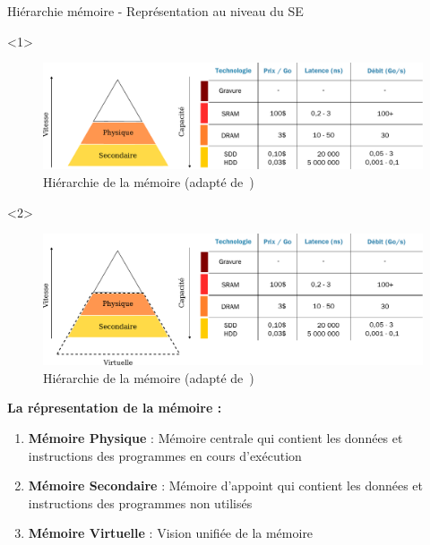 \documentclass[8pt]{beamer}
\begin{document}
\begin{frame}{Hiérarchie mémoire - Représentation au niveau du SE}
    \begin{onlyenv}<1>
        \begin{figure}
            \centering

            \includegraphics[width=\linewidth]{figures/hierarchy_memory_virtual.pdf}
            \caption{Hiérarchie de la mémoire (adapté
                de~\cite{harris2021digital})}
        \end{figure}
    \end{onlyenv}
    \begin{onlyenv}<2>
        \begin{figure}
            \centering

            \includegraphics[width=\linewidth]{figures/hierarchy_memory_virtual_physic.pdf}
            \caption{Hiérarchie de la mémoire (adapté
                de~\cite{harris2021digital})}
        \end{figure}
    \end{onlyenv}

    \textbf{La répresentation de la mémoire :}
    \begin{enumerate}
        \item \textbf{Mémoire Physique} : Mémoire centrale qui contient
              les
              données et instructions des programmes en cours d'exécution
        \item \textbf{Mémoire Secondaire} : Mémoire d'appoint qui
              contient
              les données et instructions des programmes non utilisés
        \item<2> \textbf{Mémoire Virtuelle} : Vision unifiée de la
            mémoire

    \end{enumerate}
\end{frame}
\end{document}
